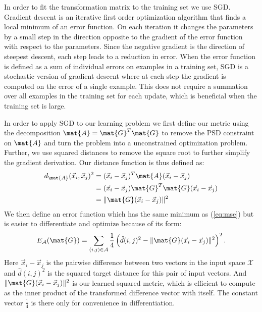 In order to fit the transformation matrix to the training set we use \acf{SGD}. Gradient descent is an iterative first order optimization algorithm that finds a local minimum of an error function. On each iteration it changes the parameters by a small step in the direction opposite to the gradient of the error function with respect to the parameters. Since the negative gradient is the direction of steepest descent, each step leads to a reduction in error. When the error function is defined as a sum of individual errors on examples in a training set, \ac{SGD} is a stochastic version of gradient descent where at each step the gradient is computed on the error of a single example. This does not require a summation over all examples in the training set for each update, which is beneficial when the training set is large. 

In order to apply \ac{SGD} to our learning problem we first define our metric using the decomposition $\mat{A} = \mat{G}^T\mat{G}$ to remove the \ac{PSD} constraint on $\mat{A}$ and turn the problem into a unconstrained optimization problem. Further, we use squared distances to remove the square root to further simplify the gradient derivation. Our distance function is thus defined as:
\begin{align}
d_{\mat{A}}(\vec{x}_i, \vec{x}_j)^2 &= (\vec{x}_i - \vec{x}_j)^T \mat{A} (\vec{x}_i - \vec{x}_j) \\
&= (\vec{x}_i - \vec{x}_j) \mat{G}^T \mat{G} (\vec{x}_i - \vec{x}_j) \\
&= \|\mat{G}(\vec{x}_i - \vec{x}_j)\|^2
\end{align}
We then define an error function which has the same minimum as (\ref{eq:mse}) but is easier to differentiate and optimize because of its form:
\begin{equation}
E_{\mathcal{A}}(\mat{G}) =  \sum_{(i,j) \in \mathcal{A}}  \frac{1}{4} \left( \hat{d}(i,j)^2 -  \|\mat{G}(\vec{x}_i - \vec{x}_j)\|^2 \right)^2.
\label{eq:opt_target}
\end{equation}
Here $\vec{x}_i - \vec{x}_j$ is the pairwise difference between two vectors in the input space $\mathcal{X}$ and $\hat{d}(i,j)^2$ is the squared target distance for this pair of input vectors. And $\|\mat{G}(\vec{x}_i - \vec{x}_j)\|^2$ is our learned squared metric, which is efficient to compute as the inner product of the transformed difference vector with itself. The constant vector $\frac{1}{4}$ is there only for convenience in differentiation. 

